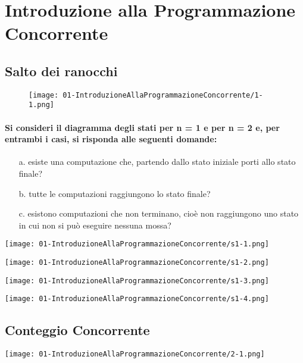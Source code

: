 \chapter{Introduzione alla Programmazione Concorrente}

\section{Salto dei ranocchi}


\begin{figure}[h]
    \centering
    \texttt{[image: 01-IntroduzioneAllaProgrammazioneConcorrente/1-1.png]}
\end{figure}

\subsubsection{Si consideri il diagramma degli stati per n = 1 e per n = 2 e, per entrambi i casi, si risponda alle seguenti domande:}

\begin{enumerate}
  \item [a.] esiste una computazione che, partendo dallo stato iniziale porti allo stato finale?
  \item [b.] tutte le computazioni raggiungono lo stato finale?
  \item [c.] esistono computazioni che non terminano, cioè non raggiungono uno stato in cui non si può eseguire nessuna mossa?
\end{enumerate}

\begin{center}
    \texttt{[image: 01-IntroduzioneAllaProgrammazioneConcorrente/s1-1.png]}
\end{center}

\begin{center}
    \texttt{[image: 01-IntroduzioneAllaProgrammazioneConcorrente/s1-2.png]}
\end{center}

\begin{center}
    \texttt{[image: 01-IntroduzioneAllaProgrammazioneConcorrente/s1-3.png]}
\end{center}

\begin{center}
    \texttt{[image: 01-IntroduzioneAllaProgrammazioneConcorrente/s1-4.png]}
\end{center}
\pagebreak
\section{Conteggio Concorrente}

\begin{center}
    \centering
    \texttt{[image: 01-IntroduzioneAllaProgrammazioneConcorrente/2-1.png]}
  \end{center}

